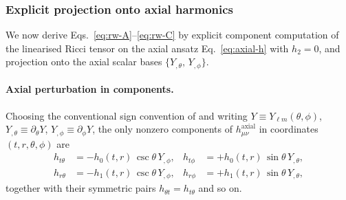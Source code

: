 
\subsubsection*{Explicit projection onto axial harmonics}
\label{sec:rw-axial-projection}

We now derive Eqs.~\eqref{eq:rw-A}--\eqref{eq:rw-C} by explicit
component computation of the linearised Ricci tensor on the
axial ansatz Eq.~\eqref{eq:axial-h} with $h_{2} = 0$, and
projection onto the axial scalar bases
$\{Y_{,\theta},\,Y_{,\phi}\}$.

\paragraph{Axial perturbation in components.}
Choosing the conventional sign convention of
\citet[Eq.~(10)]{ReggeWheeler1957} and writing
$Y \equiv Y_{\ell m}(\theta,\phi)$,
$Y_{,\theta} \equiv \partial_{\theta} Y$,
$Y_{,\phi} \equiv \partial_{\phi} Y$, the only nonzero
components of $h_{\mu\nu}^{\mathrm{axial}}$ in coordinates
$(t,r,\theta,\phi)$ are
\begin{equation}
\begin{aligned}
  h_{t\theta} &= -h_{0}(t,r)\,\csc\theta\,Y_{,\phi},
    & h_{t\phi} &= +h_{0}(t,r)\,\sin\theta\,Y_{,\theta},\\
  h_{r\theta} &= -h_{1}(t,r)\,\csc\theta\,Y_{,\phi},
    & h_{r\phi} &= +h_{1}(t,r)\,\sin\theta\,Y_{,\theta},
\end{aligned}
\label{eq:axial-components}
\end{equation}
together with their symmetric pairs
$h_{\theta t}=h_{t\theta}$ and so on.

